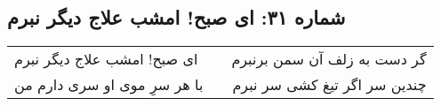 \begin{center}
\section*{شماره ۳۱: ای صبح! امشب علاج دیگر نبرم}
\label{sec:031}
\begin{longtable}{l p{0.5cm} r}
ای صبح! امشب علاج دیگر نبرم
&&
گر دست به زلف آن سمن برنبرم
\\
با هر سرِ موی او سری دارم من
&&
چندین سر اگر تیغ کشی سر نبرم
\\
\end{longtable}
\end{center}
